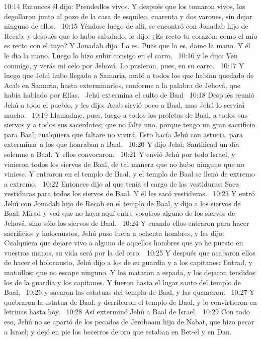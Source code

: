 10:14 Entonces él dijo: Prendedlos vivos. Y después que los tomaron vivos, los degollaron junto al pozo de la casa de esquileo, cuarenta y dos varones, sin dejar ninguno de ellos.  
10:15 Yéndose luego de allí, se encontró con Jonadab hijo de Recab; y después que lo hubo saludado, le dijo: ¿Es recto tu corazón, como el mío es recto con el tuyo? Y Jonadab dijo: Lo es. Pues que lo es, dame la mano. Y él le dio la mano. Luego lo hizo subir consigo en el carro,  
10:16 y le dijo: Ven conmigo, y verás mi celo por Jehová. Lo pusieron, pues, en su carro.  
10:17 Y luego que Jehú hubo llegado a Samaria, mató a todos los que habían quedado de Acab en Samaria, hasta exterminarlos, conforme a la palabra de Jehová, que había hablado por Elías.  
Jehú extermina el culto de Baal  
10:18 Después reunió Jehú a todo el pueblo, y les dijo: Acab sirvió poco a Baal, mas Jehú lo servirá mucho.  
10:19 Llamadme, pues, luego a todos los profetas de Baal, a todos sus siervos y a todos sus sacerdotes; que no falte uno, porque tengo un gran sacrificio para Baal; cualquiera que faltare no vivirá. Esto hacía Jehú con astucia, para exterminar a los que honraban a Baal.  
10:20 Y dijo Jehú: Santificad un día solemne a Baal. Y ellos convocaron.  
10:21 Y envió Jehú por todo Israel, y vinieron todos los siervos de Baal, de tal manera que no hubo ninguno que no viniese. Y entraron en el templo de Baal, y el templo de Baal se llenó de extremo a extremo.  
10:22 Entonces dijo al que tenía el cargo de las vestiduras: Saca vestiduras para todos los siervos de Baal. Y él les sacó vestiduras.  
10:23 Y entró Jehú con Jonadab hijo de Recab en el templo de Baal, y dijo a los siervos de Baal: Mirad y ved que no haya aquí entre vosotros alguno de los siervos de Jehová, sino sólo los siervos de Baal.  
10:24 Y cuando ellos entraron para hacer sacrificios y holocaustos, Jehú puso fuera a ochenta hombres, y les dijo: Cualquiera que dejare vivo a alguno de aquellos hombres que yo he puesto en vuestras manos, su vida será por la del otro.  
10:25 Y después que acabaron ellos de hacer el holocausto, Jehú dijo a los de su guardia y a los capitanes: Entrad, y matadlos; que no escape ninguno. Y los mataron a espada, y los dejaron tendidos los de la guardia y los capitanes. Y fueron hasta el lugar santo del templo de Baal,  
10:26 y sacaron las estatuas del templo de Baal, y las quemaron.  
10:27 Y quebraron la estatua de Baal, y derribaron el templo de Baal, y lo convirtieron en letrinas hasta hoy.  
10:28 Así exterminó Jehú a Baal de Israel.  
10:29 Con todo eso, Jehú no se apartó de los pecados de Jeroboam hijo de Nabat, que hizo pecar a Israel; y dejó en pie los becerros de oro que estaban en Bet-el y en Dan. 

